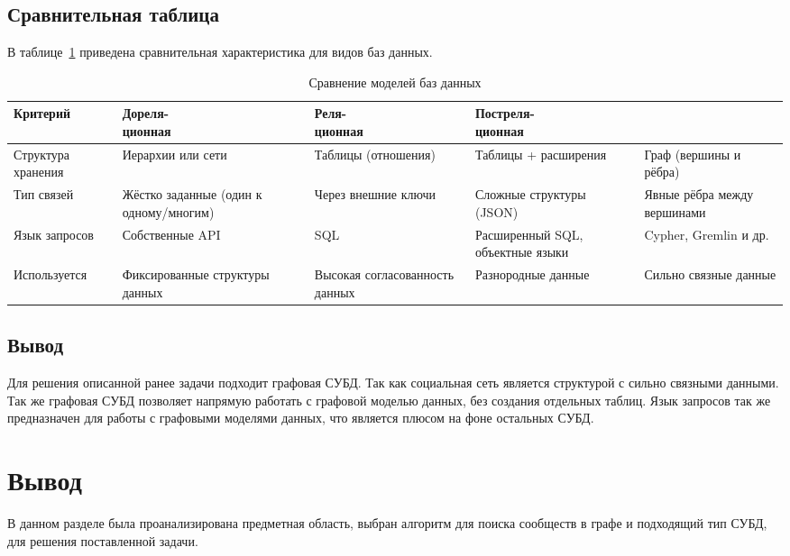 \subsection{Сравнительная таблица}

В таблице~\ref{tbl:db_models} приведена сравнительная характеристика для видов баз данных.

\begin{table}[H]
	\begin{center}
		\begin{threeparttable}
			\caption{Сравнение моделей баз данных}
			\label{tbl:db_models}
			\begin{tabular}{|p{3cm}|p{3.5cm}|p{2.1cm}|p{2.9cm}|p{2.6cm}|}
				\hline
				Критерий & \makecell{Дореля-\\ционная} & \makecell{Реля-\\ционная} & \makecell{Постреля-\\ционная} & \makecell{Графовая} \\
				\hline
				Структура хранения & Иерархии или сети & Таблицы (отношения) & Таблицы + расширения & Граф (вершины и рёбра) \\
				\hline
				Тип связей & Жёстко заданные (один к одному/многим) & Через внешние ключи & Сложные структуры (JSON) & Явные рёбра между вершинами \\
				\hline
				Язык запросов & Собственные API & SQL & Расширенный SQL, объектные языки & Cypher, Gremlin и др. \\
				\hline
				Используется & Фиксированные структуры данных & Высокая согласованность данных & Разнородные данные & Сильно связные данные \\
				\hline
			\end{tabular}
		\end{threeparttable}
	\end{center}
\end{table}

\subsection{Вывод}

Для решения описанной ранее задачи подходит графовая СУБД. Так как социальная сеть является структурой с сильно связными данными. Так же графовая СУБД позволяет напрямую работать с графовой моделью данных, без создания отдельных таблиц. Язык запросов так же предназначен для работы с графовыми моделями данных, что является плюсом на фоне остальных СУБД.


\section*{Вывод}

В данном разделе была проанализирована предметная область, выбран алгоритм для поиска сообществ в графе и подходящий тип СУБД, для решения поставленной задачи.
